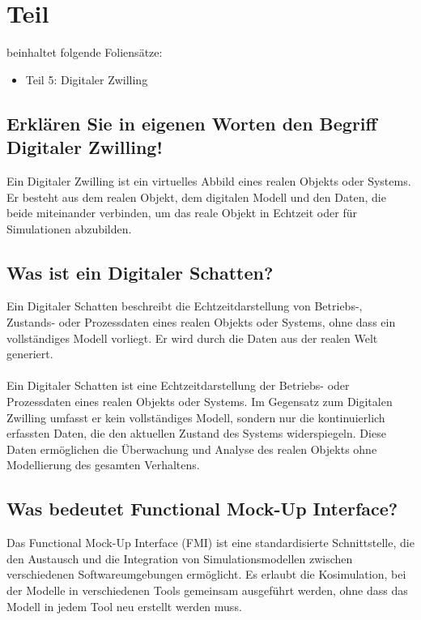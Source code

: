 \section{Teil}
beinhaltet folgende Foliensätze:

\begin{itemize}
    \item Teil 5: Digitaler Zwilling

\end{itemize}

\subsection{Erklären Sie in eigenen Worten den Begriff Digitaler Zwilling!}
Ein Digitaler Zwilling ist ein virtuelles Abbild eines realen Objekts oder Systems. 
Er besteht aus dem realen Objekt, dem digitalen Modell und den Daten, die beide miteinander verbinden, um das reale Objekt in Echtzeit oder für Simulationen abzubilden.


\subsection{Was ist ein Digitaler Schatten?}
Ein Digitaler Schatten beschreibt die Echtzeitdarstellung von Betriebs-, Zustands- oder Prozessdaten eines realen Objekts oder Systems, ohne dass ein vollständiges Modell vorliegt. 
Er wird durch die Daten aus der realen Welt generiert.\\
\\
Ein Digitaler Schatten ist eine Echtzeitdarstellung der Betriebs- oder Prozessdaten eines realen Objekts oder Systems. 
Im Gegensatz zum Digitalen Zwilling umfasst er kein vollständiges Modell, sondern nur die kontinuierlich erfassten Daten, die den aktuellen Zustand des Systems widerspiegeln. 
Diese Daten ermöglichen die Überwachung und Analyse des realen Objekts ohne Modellierung des gesamten Verhaltens.


\subsection{Was bedeutet Functional Mock-Up Interface?}
Das Functional Mock-Up Interface (FMI) ist eine standardisierte Schnittstelle, die den Austausch und die Integration von Simulationsmodellen zwischen verschiedenen Softwareumgebungen ermöglicht. 
Es erlaubt die Kosimulation, bei der Modelle in verschiedenen Tools gemeinsam ausgeführt werden, ohne dass das Modell in jedem Tool neu erstellt werden muss.